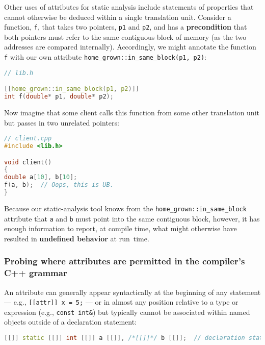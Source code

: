 Other uses of attributes for static analysis include statements of
properties that cannot otherwise be deduced within a single translation
unit. Consider a function, \texttt{f}, that takes two pointers,
\texttt{p1} and \texttt{p2}, and has a \textbf{precondition} that both
pointers must refer to the same contiguous block of memory (as the two
addresses are compared internally). Accordingly, we might annotate the
function \texttt{f} with our own attribute
\texttt{home\_grown::in\_same\_block(p1,}~\texttt{p2)}:

\begin{lstlisting}[language=C++]
// lib.h

[[home_grown::in_same_block(p1, p2)]]
int f(double* p1, double* p2);
\end{lstlisting}

\noindent Now imagine that some client calls this function from some other
translation unit but passes in two unrelated pointers:

\begin{lstlisting}[language=C++]
// client.cpp
#include <lib.h>

void client()
{
double a[10], b[10];
f(a, b);  // Oops, this is UB.
}
\end{lstlisting}

\noindent Because our static-analysis tool knows from the
\texttt{home\_grown::in\_same\_block} attribute that \texttt{a} and
\texttt{b} must point into the same contiguous block, however, it has
enough information to report, at compile time, what might otherwise have
resulted in \textbf{undefined behavior} at run~time.

\subsubsection[Probing where attributes are permitted in the compiler’s C++ grammar]{Probing where attributes are permitted in the compiler’s C++ grammar}\label{probing-where-attributes-are-permitted-in-the-compiler’s-c++-grammar}

An attribute can generally appear syntactically at the beginning of any
statement --- e.g.,
\texttt{[[attr]]}~\texttt{x}~\texttt{=}~\texttt{5;} --- or in almost any
position relative to a type or expression (e.g.,
\texttt{const}~\texttt{int\&}) but typically cannot be associated
within named objects outside of a declaration statement:

\begin{lstlisting}[language=C++]
[[]] static [[]] int [[]] a [[]], /*[[]]*/ b [[]];  // declaration statement
\end{lstlisting}

